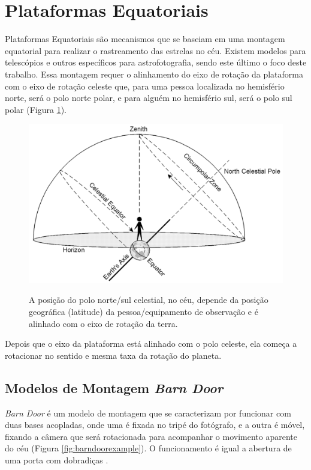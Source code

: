 \section{Plataformas Equatoriais}

Plataformas Equatoriais são mecanismos que se baseiam em uma montagem equatorial para realizar o rastreamento das estrelas no céu. Existem modelos para telescópios e outros específicos para astrofotografia, sendo este último o foco deste trabalho. Essa montagem requer o alinhamento do eixo de rotação da plataforma com o eixo de rotação celeste que, para uma pessoa localizada no hemisfério norte, será o polo norte polar, e para alguém no hemisfério sul, será o polo sul polar (Figura \ref{fig:celestialchart}). 

\begin{figure}[!htb]
	\centering
	\caption{A posição do polo norte/sul celestial, no céu, depende da posição geográfica (latitude) da pessoa/equipamento de observação e é alinhado com o eixo de rotação da terra.}
	\includegraphics[width=0.8\linewidth]{figuras/celestialchart}
	\label{fig:celestialchart}
\end{figure}

Depois que o eixo da plataforma está alinhado com o polo celeste, ela começa a rotacionar no sentido e mesma taxa da rotação do planeta.

\subsection[Modelos de Montagem]{Modelos de Montagem \textit{Barn Door}}
\textit{Barn Door} é um modelo de montagem que se caracterizam por funcionar com duas bases acopladas, onde uma é fixada no tripé do fotógrafo, e a outra é móvel, fixando a câmera que será rotacionada para acompanhar o movimento aparente do céu (Figura \ref{fig:barndoorexample}). O funcionamento é igual a abertura de uma porta com dobradiças \cite{site:pentaxBarnDoor}. 

